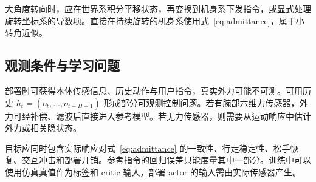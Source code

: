 大角度转向时，应在世界系积分平移状态，再变换到机身系下发指令，或显式处理旋转坐标系的导数项。直接在持续旋转的机身系使用式~\eqref{eq:admittance}，属于小转角近似。

\subsection{观测条件与学习问题}
部署时可获得本体传感信息、历史动作与用户指令，真实外力可能不可测。可用历史 $h_t=(o_t,\ldots,o_{t-H+1})$ 形成部分可观测控制问题。若有腕部六维力传感器，外力可经补偿、滤波后直接进入参考模型。若无力传感器，则需要从运动响应中估计外力或相关隐状态。

目标应同时包含实际响应对式~\eqref{eq:admittance} 的一致性、行走稳定性、松手恢复、交互冲击和部署开销。参考指令的回归误差只能度量其中一部分。训练中可以使用仿真真值作为标签和 critic 输入，部署 actor 的输入需由实际传感器产生。
